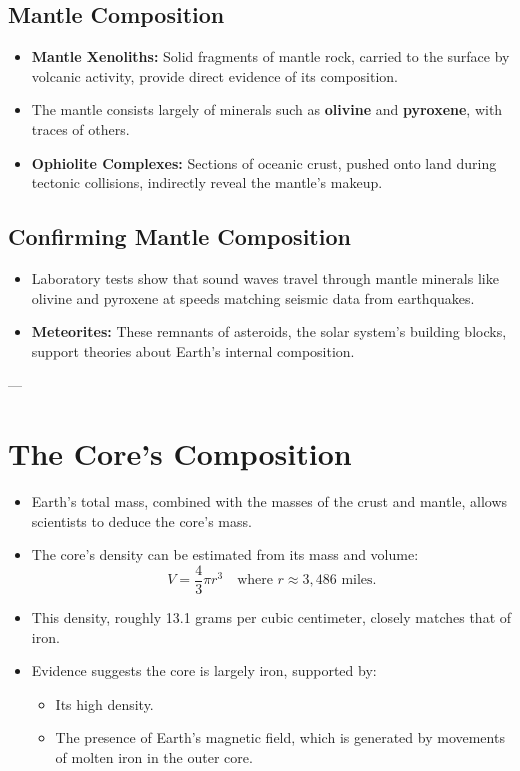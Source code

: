 \documentclass[12pt]{article}
\begin{document}
\subsection*{Mantle Composition}
\begin{itemize}
    \item \textbf{Mantle Xenoliths:} Solid fragments of mantle rock, carried to the surface by volcanic activity, provide direct evidence of its composition.
    \item The mantle consists largely of minerals such as \textbf{olivine} and \textbf{pyroxene}, with traces of others.
    \item \textbf{Ophiolite Complexes:} Sections of oceanic crust, pushed onto land during tectonic collisions, indirectly reveal the mantle's makeup.
\end{itemize}

\subsection*{Confirming Mantle Composition}
\begin{itemize}
    \item Laboratory tests show that sound waves travel through mantle minerals like olivine and pyroxene at speeds matching seismic data from earthquakes.
    \item \textbf{Meteorites:} These remnants of asteroids, the solar system's building blocks, support theories about Earth's internal composition.
\end{itemize}

---

\section*{The Core's Composition}
\begin{itemize}
    \item Earth's total mass, combined with the masses of the crust and mantle, allows scientists to deduce the core's mass.
    \item The core's density can be estimated from its mass and volume:
    \[
    V = \frac{4}{3} \pi r^3 \quad \text{where } r \approx 3,486 \text{ miles}.
    \]
    \item This density, roughly 13.1 grams per cubic centimeter, closely matches that of iron.
    \item Evidence suggests the core is largely iron, supported by:
    \begin{itemize}
        \item Its high density.
        \item The presence of Earth's magnetic field, which is generated by movements of molten iron in the outer core.
    \end{itemize}
\end{itemize}
\end{document}

